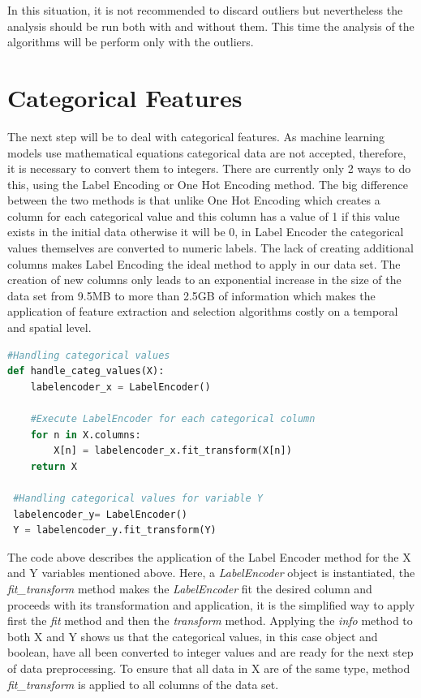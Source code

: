 In this situation, it is not recommended to discard outliers but nevertheless the analysis should be run both with and without them. This time the analysis of the algorithms will be perform only with the outliers.

\section{Categorical Features} %
\label{sec:categorical_values}
\hspace{10px}The next step will be to deal with categorical features. As machine learning models use mathematical equations categorical data are not accepted, therefore, it is necessary to convert them to integers. There are currently only 2 ways to do this, using the Label Encoding or One Hot Encoding method. The big difference between the two methods is that unlike One Hot Encoding which creates a column for each categorical value and this column has a value of 1 if this value exists in the initial data otherwise it will be 0, in Label Encoder the categorical values themselves are converted to numeric labels.
The lack of creating additional columns makes Label Encoding the ideal method to apply in our data set. The creation of new columns only leads to an exponential increase in the size of the data set from 9.5MB to more than 2.5GB of information which makes the application of feature extraction and selection algorithms costly on a temporal and spatial level.

\begin{lstlisting}[language=Python]
#Handling categorical values
def handle_categ_values(X):
    labelencoder_x = LabelEncoder()
    
    #Execute LabelEncoder for each categorical column
    for n in X.columns:
        X[n] = labelencoder_x.fit_transform(X[n])
    return X
        
 #Handling categorical values for variable Y
 labelencoder_y= LabelEncoder()  
 Y = labelencoder_y.fit_transform(Y)
\end{lstlisting}

The code above describes the application of the Label Encoder method for the X and Y variables mentioned above. Here, a \textit{LabelEncoder} object is instantiated, the \textit{fit\_transform} method makes the \textit{LabelEncoder} fit the desired column and proceeds with its transformation and application, it is the simplified way to apply first the \textit{fit} method and then the \textit{transform} method. Applying the \textit{info} method to both X and Y shows us that the categorical values, in this case object and boolean, have all been converted to integer values and are ready for the next step of data preprocessing. To ensure that all data in X are of the same type, method \textit{fit\_transform} is applied to all columns of the data set.

